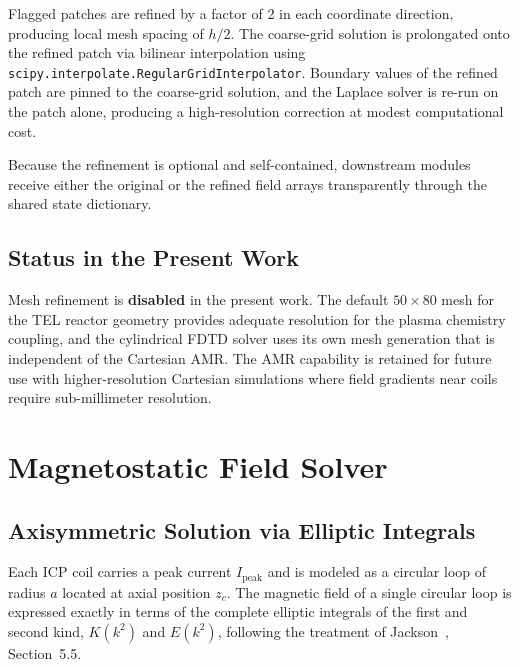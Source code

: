 \documentclass[11pt,a4paper]{report}
\begin{document}
Flagged patches are refined by a factor of 2 in each coordinate direction, producing local mesh spacing of $h/2$.  The coarse-grid solution is prolongated onto the refined patch via bilinear interpolation using \texttt{scipy.interpolate.RegularGridInterpolator}.  Boundary values of the refined patch are pinned to the coarse-grid solution, and the Laplace solver is re-run on the patch alone, producing a high-resolution correction at modest computational cost.

Because the refinement is optional and self-contained, downstream modules receive either the original or the refined field arrays transparently through the shared state dictionary.

\subsection{Status in the Present Work}

Mesh refinement is \textbf{disabled} in the present work.  The default $50 \times 80$ mesh for the TEL reactor geometry provides adequate resolution for the plasma chemistry coupling, and the cylindrical FDTD solver uses its own mesh generation that is independent of the Cartesian AMR.  The AMR capability is retained for future use with higher-resolution Cartesian simulations where field gradients near coils require sub-millimeter resolution.


\section{Magnetostatic Field Solver}
\label{sec:m04}

\subsection{Axisymmetric Solution via Elliptic Integrals}

Each ICP coil carries a peak current $I_\mathrm{peak}$ and is modeled as a circular loop of radius $a$ located at axial position $z_c$.  The magnetic field of a single circular loop is expressed exactly in terms of the complete elliptic integrals of the first and second kind, $K(k^2)$ and $E(k^2)$, following the treatment of Jackson~\cite{Jackson1998}, Section~5.5.
\end{document}
